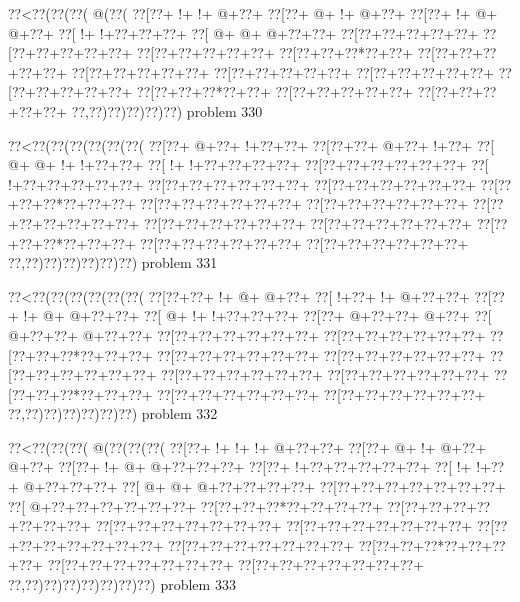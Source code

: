 \vbox{\vbox{\goo
\0??<\0??(\0??(\0??(\- @(\0??(
\0??[\0??+\- !+\- !+\- @+\0??+
\0??[\0??+\- @+\- !+\- @+\0??+
\0??[\0??+\- !+\- @+\- @+\0??+
\0??[\- !+\- !+\0??+\0??+\0??+
\0??[\- @+\- @+\- @+\0??+\0??+
\0??[\0??+\0??+\0??+\0??+\0??+
\0??[\0??+\0??+\0??+\0??+\0??+
\0??[\0??+\0??+\0??+\0??+\0??+
\0??[\0??+\0??+\0??*\0??+\0??+
\0??[\0??+\0??+\0??+\0??+\0??+
\0??[\0??+\0??+\0??+\0??+\0??+
\0??[\0??+\0??+\0??+\0??+\0??+
\0??[\0??+\0??+\0??+\0??+\0??+
\0??[\0??+\0??+\0??+\0??+\0??+
\0??[\0??+\0??+\0??*\0??+\0??+
\0??[\0??+\0??+\0??+\0??+\0??+
\0??[\0??+\0??+\0??+\0??+\0??+
\0??,\0??)\0??)\0??)\0??)\0??)
}
\hfil problem 330\hfil\break
}

\vbox{\vbox{\goo
\0??<\0??(\0??(\0??(\0??(\0??(\0??(
\0??[\0??+\- @+\0??+\- !+\0??+\0??+
\0??[\0??+\0??+\- @+\0??+\- !+\0??+
\0??[\- @+\- @+\- !+\- !+\0??+\0??+
\0??[\- !+\- !+\0??+\0??+\0??+\0??+
\0??[\0??+\0??+\0??+\0??+\0??+\0??+
\0??[\- !+\0??+\0??+\0??+\0??+\0??+
\0??[\0??+\0??+\0??+\0??+\0??+\0??+
\0??[\0??+\0??+\0??+\0??+\0??+\0??+
\0??[\0??+\0??+\0??*\0??+\0??+\0??+
\0??[\0??+\0??+\0??+\0??+\0??+\0??+
\0??[\0??+\0??+\0??+\0??+\0??+\0??+
\0??[\0??+\0??+\0??+\0??+\0??+\0??+
\0??[\0??+\0??+\0??+\0??+\0??+\0??+
\0??[\0??+\0??+\0??+\0??+\0??+\0??+
\0??[\0??+\0??+\0??*\0??+\0??+\0??+
\0??[\0??+\0??+\0??+\0??+\0??+\0??+
\0??[\0??+\0??+\0??+\0??+\0??+\0??+
\0??,\0??)\0??)\0??)\0??)\0??)\0??)
}
\hfil problem 331\hfil\break
}

\vbox{\vbox{\goo
\0??<\0??(\0??(\0??(\0??(\0??(\0??(
\0??[\0??+\0??+\- !+\- @+\- @+\0??+
\0??[\- !+\0??+\- !+\- @+\0??+\0??+
\0??[\0??+\- !+\- @+\- @+\0??+\0??+
\0??[\- @+\- !+\- !+\0??+\0??+\0??+
\0??[\0??+\- @+\0??+\0??+\- @+\0??+
\0??[\- @+\0??+\0??+\- @+\0??+\0??+
\0??[\0??+\0??+\0??+\0??+\0??+\0??+
\0??[\0??+\0??+\0??+\0??+\0??+\0??+
\0??[\0??+\0??+\0??*\0??+\0??+\0??+
\0??[\0??+\0??+\0??+\0??+\0??+\0??+
\0??[\0??+\0??+\0??+\0??+\0??+\0??+
\0??[\0??+\0??+\0??+\0??+\0??+\0??+
\0??[\0??+\0??+\0??+\0??+\0??+\0??+
\0??[\0??+\0??+\0??+\0??+\0??+\0??+
\0??[\0??+\0??+\0??*\0??+\0??+\0??+
\0??[\0??+\0??+\0??+\0??+\0??+\0??+
\0??[\0??+\0??+\0??+\0??+\0??+\0??+
\0??,\0??)\0??)\0??)\0??)\0??)\0??)
}
\hfil problem 332\hfil\break
}

\vbox{\vbox{\goo
\0??<\0??(\0??(\0??(\- @(\0??(\0??(\0??(
\0??[\0??+\- !+\- !+\- !+\- @+\0??+\0??+
\0??[\0??+\- @+\- !+\- @+\0??+\- @+\0??+
\0??[\0??+\- !+\- @+\- @+\0??+\0??+\0??+
\0??[\0??+\- !+\0??+\0??+\0??+\0??+\0??+
\0??[\- !+\- !+\0??+\- @+\0??+\0??+\0??+
\0??[\- @+\- @+\- @+\0??+\0??+\0??+\0??+
\0??[\0??+\0??+\0??+\0??+\0??+\0??+\0??+
\0??[\- @+\0??+\0??+\0??+\0??+\0??+\0??+
\0??[\0??+\0??+\0??*\0??+\0??+\0??+\0??+
\0??[\0??+\0??+\0??+\0??+\0??+\0??+\0??+
\0??[\0??+\0??+\0??+\0??+\0??+\0??+\0??+
\0??[\0??+\0??+\0??+\0??+\0??+\0??+\0??+
\0??[\0??+\0??+\0??+\0??+\0??+\0??+\0??+
\0??[\0??+\0??+\0??+\0??+\0??+\0??+\0??+
\0??[\0??+\0??+\0??*\0??+\0??+\0??+\0??+
\0??[\0??+\0??+\0??+\0??+\0??+\0??+\0??+
\0??[\0??+\0??+\0??+\0??+\0??+\0??+\0??+
\0??,\0??)\0??)\0??)\0??)\0??)\0??)\0??)
}
\hfil problem 333\hfil\break
}

